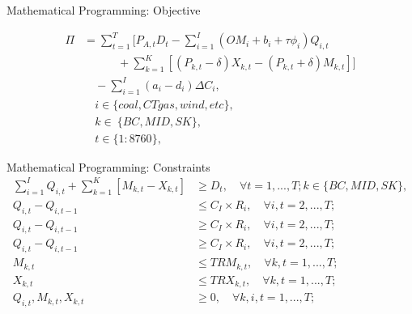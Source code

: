 \documentclass[newPxFont,numfooter,progressbar,sectionpages]{beamer}
\begin{document}

\begin{frame}[c]{Mathematical Programming: Objective}

\begin{align}\label{eq1}
\Pi & = \sum_{t=1}^T  [   P_{A,t} D_t  - \sum_{i=1}^I (OM_i + b_i + \tau \phi_i) Q_{i,t} \nonumber  \\
& \qquad {} \quad  + \sum_{k=1}^K  [  (P_{k,t} - \delta ) X_{k,t} - (P_{k,t} + \delta) M_{k,t}  ] ]  \\
& \quad - \sum_{i = 1}^I (a_i - d_i) \Delta C_i, \nonumber  \\
& \quad i \in \{coal,CT gas, wind, etc \} , \nonumber  \\
& \quad k \in \ \{ BC, MID, SK  \},\nonumber \\
& \quad t \in \{1:8760\} ,  \nonumber      
\end{align}


\end{frame}


\begin{frame}[c]{Mathematical Programming: Constraints}
\begin{align}\label{eq2}
\sum_{i = 1}^I Q_{i,t} + \sum_{k=1}^K  [  M_{k,t} - X_{k,t} ]  &   \ge D_t,\quad \forall t = 1,...,T; k \in  \{ BC, MID, SK  \},   \\
%
Q_{i,t} -    Q_{i,t-1}  & \le C_I \times R_i ,  \quad \forall i,t = 2,...,T; \\
Q_{i,t} -     Q_{i,t-1}  & \ge C_I \times R_i ,  \quad \forall i,t = 2,...,T; \\
%
Q_{i,t} -    Q_{i,t-1}  & \ge C_I \times R_i ,  \quad \forall i,t = 2,...,T; \\
%
M_{k,t} & \le TRM_{k,t} ,  \quad \forall k, t=1,...,T; \\
%
X_{k,t} & \le TRX_{k,t} ,  \quad \forall k, t=1,...,T; \\
Q_{i,t}, M_{k,t}, X_{k,t} & \ge 0 ,  \quad \forall k,i,t=1,...,T;
\end{align}

\end{frame}
\end{document}
